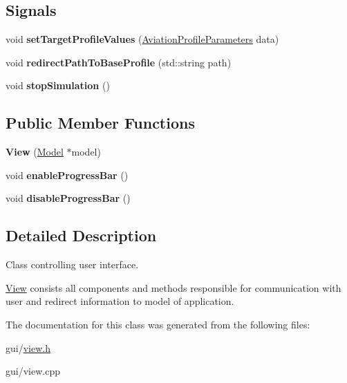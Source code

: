 \subsection*{Signals}
\begin{DoxyCompactItemize}
\item 
\hypertarget{class_view_a17beef462b991abf311bcaeacfe3b7d8}{}\label{class_view_a17beef462b991abf311bcaeacfe3b7d8} 
void {\bfseries set\+Target\+Profile\+Values} (\hyperlink{struct_aviation_profile_parameters}{Aviation\+Profile\+Parameters} data)
\item 
\hypertarget{class_view_a29594d0b3b97def30b5586ddaf11d288}{}\label{class_view_a29594d0b3b97def30b5586ddaf11d288} 
void {\bfseries redirect\+Path\+To\+Base\+Profile} (std\+::string path)
\item 
\hypertarget{class_view_ae3633aa70a59017a0f3728a9a7e455bd}{}\label{class_view_ae3633aa70a59017a0f3728a9a7e455bd} 
void {\bfseries stop\+Simulation} ()
\end{DoxyCompactItemize}
\subsection*{Public Member Functions}
\begin{DoxyCompactItemize}
\item 
\hypertarget{class_view_adc973dbae490e2040f813633e00b6e6f}{}\label{class_view_adc973dbae490e2040f813633e00b6e6f} 
{\bfseries View} (\hyperlink{class_model}{Model} $\ast$model)
\item 
\hypertarget{class_view_aea935ceb9d8f3d9b0153c6b9890c903f}{}\label{class_view_aea935ceb9d8f3d9b0153c6b9890c903f} 
void {\bfseries enable\+Progress\+Bar} ()
\item 
\hypertarget{class_view_a211d282520bc0d5373e3a2f57a611ffc}{}\label{class_view_a211d282520bc0d5373e3a2f57a611ffc} 
void {\bfseries disable\+Progress\+Bar} ()
\end{DoxyCompactItemize}


\subsection{Detailed Description}
Class controlling user interface. 

\hyperlink{class_view}{View} consists all components and methods responsible for communication with user and redirect information to model of application. 

The documentation for this class was generated from the following files\+:\begin{DoxyCompactItemize}
\item 
gui/\hyperlink{view_8h}{view.\+h}\item 
gui/view.\+cpp\end{DoxyCompactItemize}

